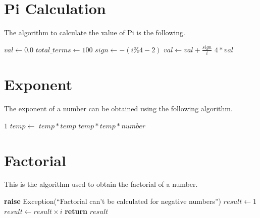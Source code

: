 \documentclass{report}
\begin{document}
\section{Pi Calculation}
\begin{flushleft}
  The algorithm to calculate the value of Pi is the following.
\end{flushleft}
\begin{algorithmic}[1]
        \State $val \gets 0.0$
        \State $total\_terms \gets 100$
            \State $sign \gets -(i\%4-2)$
            \State $val \gets val + \frac{sign}{i}$
        \EndFor
        \State \Return $4 * val$
    \EndFunction
\end{algorithmic}

\section{Exponent}
\begin{flushleft}
The exponent of a number can be obtained using the following algorithm.
\end{flushleft}
\begin{algorithmic}[1]
        \State \Return $1$
    \EndIf
    \State $temp \gets$ 
        \State \Return $temp * temp$
    \Else
        \State \Return $temp * temp * number$
    \EndIf
\EndFunction
\end{algorithmic}

\section{Factorial}
\begin{flushleft}
This is the algorithm used to obtain the factorial of a number.
\end{flushleft}
\begin{algorithmic}[1]
    \State \textbf{raise} Exception(``Factorial can't be calculated for negative numbers'')
  \EndIf
  \State $result \gets 1$
    \State $result \gets result \times i$
  \EndFor
  \State \textbf{return} $result$
\EndFunction
\end{algorithmic}

\printindex
\end{document}
